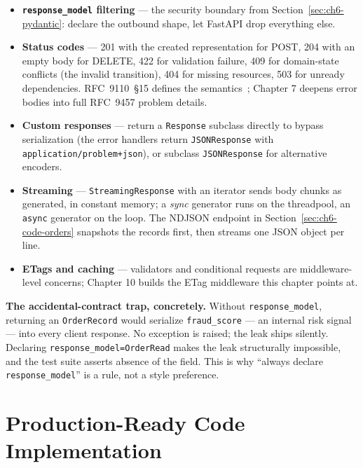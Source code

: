 \begin{itemize}
  \item \textbf{\texttt{response\_model} filtering} --- the security boundary
        from Section~\ref{sec:ch6-pydantic}: declare the outbound shape, let
        FastAPI drop everything else.
  \item \textbf{Status codes} --- 201 with the created representation for
        POST, 204 with an empty body for DELETE, 422 for validation failure,
        409 for domain-state conflicts (the invalid transition), 404 for
        missing resources, 503 for unready dependencies. RFC~9110~\S15
        defines the semantics~\cite{rfc9110}; Chapter 7 deepens error bodies
        into full RFC~9457 problem details.
  \item \textbf{Custom responses} --- return a \texttt{Response} subclass
        directly to bypass serialization (the error handlers return
        \texttt{JSONResponse} with \texttt{application/problem+json}), or
        subclass \texttt{JSONResponse} for alternative encoders.
  \item \textbf{Streaming} --- \texttt{StreamingResponse} with an iterator
        sends body chunks as generated, in constant memory; a \emph{sync}
        generator runs on the threadpool, an \texttt{async} generator on the
        loop. The NDJSON endpoint in Section~\ref{sec:ch6-code-orders}
        snapshots the records first, then streams one JSON object per line.
  \item \textbf{ETags and caching} --- validators and conditional requests
        are middleware-level concerns; Chapter 10 builds the ETag middleware
        this chapter points at.
\end{itemize}

\begin{examplebox}
\textbf{The accidental-contract trap, concretely.} Without
\texttt{response\_model}, returning an \texttt{OrderRecord} would serialize
\texttt{fraud\_score} --- an internal risk signal --- into every client
response. No exception is raised; the leak ships silently. Declaring
\texttt{response\_model=OrderRead} makes the leak structurally impossible,
and the test suite asserts absence of the field. This is why ``always declare
\texttt{response\_model}'' is a rule, not a style preference.
\end{examplebox}

\section{Production-Ready Code Implementation}
\label{sec:ch6-code}

